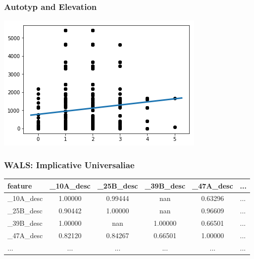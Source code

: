 \documentclass{beamer}
\begin{document}
\begin{frame}
 \frametitle{Autotyp and Elevation}
 \includegraphics[width=\textwidth]{images/AutotypRegr.png}
\end{frame}

\begin{frame}
\frametitle{WALS: Implicative Universaliae}
\begin{adjustbox}{max width=\textwidth}
\begin{tabular}{|l|cccc|l|}
\hline
feature & \_10A\_desc & \_25B\_desc & \_39B\_desc & \_47A\_desc & ... \\
\hline
\_10A\_desc &   1.00000 &   0.99444 &       nan &   0.63296 &   ... \\
\_25B\_desc &   0.90442 &   1.00000 &       nan &   0.96609 &   ... \\
\_39B\_desc &   1.00000 &       nan &   1.00000 &   0.66501 &   ... \\
\_47A\_desc &   0.82120 &   0.84267 &   0.66501 &   1.00000 &   ... \\
\hline
... &   ... &   ... &       ... &   ... &   ... \\
\hline
\end{tabular}
\end{adjustbox}
\end{frame}
\end{document}
